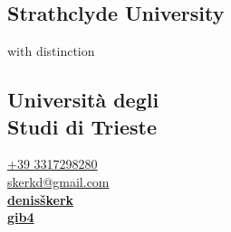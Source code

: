 \documentclass[draft]{dske-resume-openfont}
\begin{document}
%
%
\lastupdated

%
%

%
%

\begin{minipage}[t]{0.33\textwidth} 



\subsection{Strathclyde University}
with distinction\\
\sectionsep

\subsection{Universit\`{a} degli\\ Studi di Trieste}
\sectionsep



\faPhone\hspace{0.5em} \href{tel:+393317298280}{+39 3317298280}\\
\faEnvelope\hspace{0.5em} \href{mailto:skerkd@gmail.com}{skerkd@gmail.com} \\
\faLinkedin\hspace{0.5em} \href{https://www.linkedin.com/in/denis-\%C5\%A1kerk/}{\bf denisškerk} \\
\faGithub\hspace{0.5em} \href{https://github.com/gib4}{\bf gib4} \\


\end{minipage}
\end{document}
